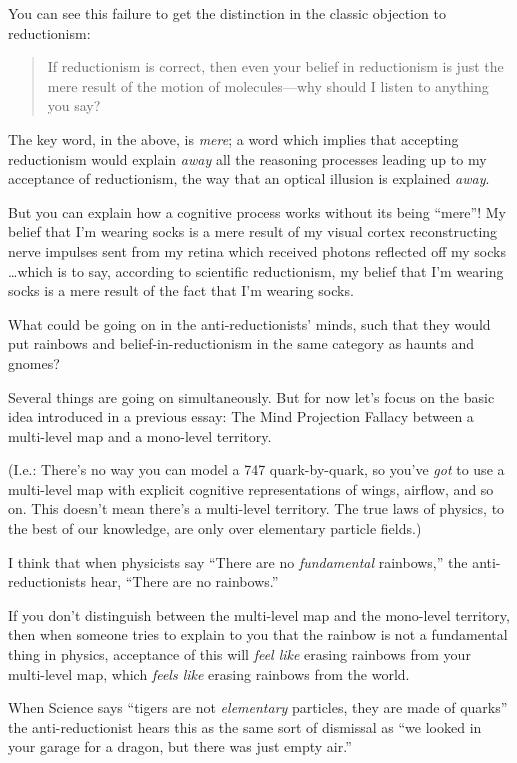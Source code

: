 {
 You can see this failure to get the distinction in the classic
objection to reductionism:}

\begin{quote}
{
 If reductionism is correct, then even your belief in reductionism
is just the mere result of the motion of molecules---why should I
listen to anything you say?}
\end{quote}

{
 The key word, in the above, is \textit{mere}; a word which implies
that accepting reductionism would explain \textit{away} all the
reasoning processes leading up to my acceptance of reductionism, the
way that an optical illusion is explained \textit{away}.}

{
 But you can explain how a cognitive process works without its
being ``mere''! My belief that
I'm wearing socks is a mere result of my visual cortex
reconstructing nerve impulses sent from my retina which received
photons reflected off my socks \ldots which is to say, according to
scientific reductionism, my belief that I'm wearing
socks is a mere result of the fact that I'm wearing
socks.}

{
 What could be going on in the anti-reductionists'
minds, such that they would put rainbows and belief-in-reductionism in
the same category as haunts and gnomes?}

{
 Several things are going on simultaneously. But for now
let's focus on the basic idea introduced in a previous
essay: The Mind Projection Fallacy between a multi-level map and a
mono-level territory.}

{
 (I.e.: There's no way you can model a 747
quark-by-quark, so you've \textit{got} to use a
multi-level map with explicit cognitive representations of wings,
airflow, and so on. This doesn't mean
there's a multi-level territory. The true laws of
physics, to the best of our knowledge, are only over elementary
particle fields.)}

{
 I think that when physicists say ``There are no
\textit{fundamental} rainbows,'' the
anti-reductionists hear, ``There are no
rainbows.''}

{
 If you don't distinguish between the multi-level
map and the mono-level territory, then when someone tries to explain to
you that the rainbow is not a fundamental thing in physics, acceptance
of this will \textit{feel like} erasing rainbows from your multi-level
map, which \textit{feels like} erasing rainbows from the world.}

{
 When Science says ``tigers are not
\textit{elementary} particles, they are made of
quarks'' the anti-reductionist hears this as the same
sort of dismissal as ``we looked in your garage for a
dragon, but there was just empty air.''}

